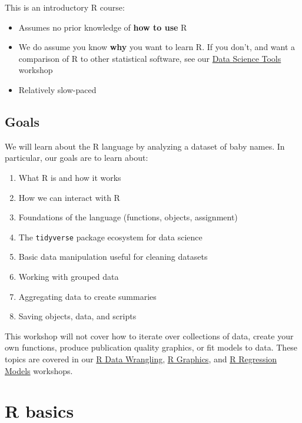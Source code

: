 \documentclass[]{book}
\providecommand{\tightlist}{%
  \setlength{\itemsep}{0pt}\setlength{\parskip}{0pt}}
\begin{document}
This is an introductory R course:

\begin{itemize}
\tightlist
\item
  Assumes no prior knowledge of \textbf{how to use} R
\item
  We do assume you know \textbf{why} you want to learn R. If you don't, and want a comparison of R to other statistical software, see our \href{./DataScienceTools.html}{Data Science Tools} workshop
\item
  Relatively slow-paced
\end{itemize}

\hypertarget{goals}{%
\subsection{Goals}\label{goals}}

We will learn about the R language by analyzing a dataset of baby names.
In particular, our goals are to learn about:

\begin{enumerate}
\def\labelenumi{\arabic{enumi}.}
\tightlist
\item
  What R is and how it works
\item
  How we can interact with R
\item
  Foundations of the language (functions, objects, assignment)
\item
  The \texttt{tidyverse} package ecosystem for data science
\item
  Basic data manipulation useful for cleaning datasets
\item
  Working with grouped data
\item
  Aggregating data to create summaries
\item
  Saving objects, data, and scripts
\end{enumerate}

This workshop will not cover how to iterate over collections of data, create
your own functions, produce publication quality graphics, or fit models to data.
These topics are covered in our \href{./RDataWrangling.html}{R Data Wrangling},
\href{./Rgraphics.html}{R Graphics}, and \href{./Rmodels.html}{R Regression Models} workshops.

\hypertarget{r-basics}{%
\section{R basics}\label{r-basics}}
\end{document}
